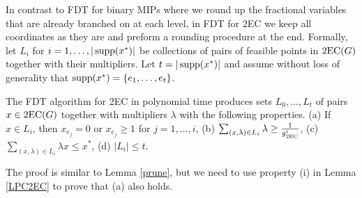 In contrast to FDT for binary MIPs where we round up the fractional variables that are already branched on at each level, in FDT for 2EC we keep all coordinates as they are and preform a rounding procedure at the end. Formally, let $L_i$ for $i=1,\ldots,|\operatorname{supp}(x^*)|$ be collections of pairs of feasible points in $\operatorname{2EC}(G)$ together with their multipliers. Let $t=|\operatorname{supp}(x^*)|$ and assume without loss of generality that $\operatorname{supp}(x^*)=\{e_1,\ldots,e_t\}$. 

\begin{lemma}\label{2ecpruning}
	The FDT algorithm for 2EC in  polynomial time produces sets $L_0,\ldots,L_t$ of pairs $x\in \operatorname{2EC}(G)$ together with multipliers $\lambda$ with the following properties.
		(a) If $x\in L_i$, then $x_{e_j}=0$ or $x_{e_j}\geq 1$ for $j=1,\ldots,i$, (b) $\sum_{(x,\lambda)\in L_i }\lambda \geq \frac{1}{g_{\operatorname{2EC}}^i}$, (c) $\sum_{(x,\lambda)\in L_i }\lambda x \leq x^*$, (d) $|L_i|\leq t$.
\end{lemma}
The proof is similar to Lemma \ref{prune}, but we need to use property (i) in Lemma \ref{LPC2EC} to prove that (a) also holds.
\iffalse{
\begin{proof}
	We proceed by induction on the $i$. Define $L_0=\{(x^*,1)\}$. It is easy to check all the properties are satisfied. Now, suppose by induction we have $L_{i-1}$ for some $i=1,\ldots,t$ that satisfies all the properties. For each solution $x^\ell$ in $L_{i-1}$ apply Lemma \ref{LPC2EC} on $x^\ell$ and $e_{i}$ to obtain $x^{\ell j}$ and $\lambda_{\ell j}$ for $j=0,1,2$. Let $L'$ be the collection that contains $(x^{\ell j},\lambda_\ell \cdot \lambda_{\ell j})$ for $j=0,1,2$, when applied to all $(x^\ell,\lambda_\ell)$ in $L_{i-1}$. Similar to the proof in Lemma \ref{prune} one can check that $L_i$ satisfies properties (b), (c). We now verify property (a). Consider a solution $x^\ell$ in $L_{i-1}$. For $e\in \{e_1,\ldots,e_{i-1}\}$ if $x^\ell_e =0$, then by property (iv) in Lemma \ref{LPC2EC} we have $x^{\ell j}=0$ for $j=0,1,2$. Otherwise by induction we have $x^{\ell}_{e}\geq 1$ in which case property (v) in Lemma \ref{LPC2EC} ensures that $x^{\ell j}_e\geq 1$ for $j=0,1,2$. Also, $x^{\ell j}_{e_i}= j$, so $x^{\ell j}_{e_i}=0$ or $x^{\ell j}_{e_i}\geq 1$ for $j=0,1,2$. 
	
	If $|L'|\geq t$ we let $L_i=L'$, otherwise apply $\prun(L')$ to obtain $L_{i}$.
\end{proof}	}\fi

